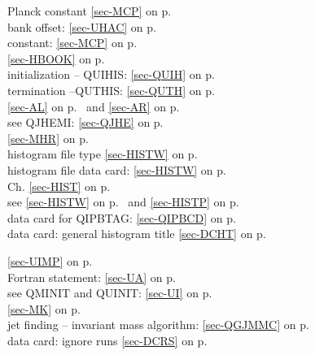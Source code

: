  
 Planck constant \ref{sec-MCP} on p.~\pageref{sec-MCP}\\
 bank offset: \ref{sec-UHAC} on p.~\pageref{sec-UHAC}\\
 constant: \ref{sec-MCP} on p.~\pageref{sec-MCP}\\
 \ref{sec-HBOOK} on p.~\pageref{sec-HBOOK}\\
 \mysubitem initialization -- QUIHIS: \ref{sec-QUIH} on p.~\pageref{sec-QUIH}\\
 \mysubitem termination --QUTHIS: \ref{sec-QUTH} on p.~\pageref{sec-QUTH}\\
 \ref{sec-AL} on p.~\pageref{sec-AL} and
 \ref{sec-AR} on p.~\pageref{sec-AR}\\
 see QJHEMI: \ref{sec-QJHE} on p.~\pageref{sec-QJHE}\\
  \ref{sec-MHR} on p.~\pageref{sec-MHR}\\
 histogram file type \ref{sec-HISTW} on p.~\pageref{sec-HISTW}\\
 histogram file data card: \ref{sec-HISTW} on p.~\pageref{sec-HISTW}\\
 Ch. \ref{sec-HIST} on p.~\pageref{sec-HIST}\\
 see \ref{sec-HISTW} on p.~\pageref{sec-HISTW} and
 \ref{sec-HISTP} on p.~\pageref{sec-HISTP}\\
 data card for QIPBTAG:  \ref{sec-QIPBCD} on p.~\pageref{sec-QIPBCD}\\
 data card: general histogram title \ref{sec-DCHT} on p.~\pageref{sec-DCHT}
 
 \ref{sec-UIMP} on p.~\pageref{sec-UIMP}\\
 Fortran statement: \ref{sec-UA} on p.~\pageref{sec-UA}\\
 see QMINIT and QUINIT: \ref{sec-UI} on p.~\pageref{sec-UI}\\
 \ref{sec-MK} on p.~\pageref{sec-MK}\\
 jet finding -- invariant mass  algorithm:
 \ref{sec-QGJMMC} on p.~\pageref{sec-QGJMMC}\\
 data card: ignore runs \ref{sec-DCRS} on p.~\pageref{sec-DCRS}
 
